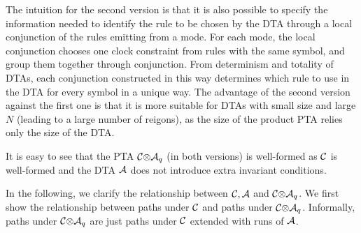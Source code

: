 The intuition for the second version is that it is also possible to specify the information needed to identify the rule to be chosen by the DTA through a local conjunction of the rules emitting from a mode.
For each mode, the local conjunction chooses one clock constraint from rules with the same symbol, and group them together through conjunction.
From determinism and totality of DTAs,
each conjunction constructed in this way determines which rule to use in the DTA for every symbol in a unique way.
The advantage of the second version against the first one is that it is more suitable for DTAs with small size and large $N$ (leading to a large number of reigons), as the size of the product PTA relies only the size of the DTA.
\vspace{-0.8em}
\begin{remark}
It is easy to see that the PTA ${\mathcal{C}}{\otimes}{\mathcal{A}_q}$ (in both versions) is well-formed as $\mathcal{C}$ is well-formed and the DTA $\mathcal{A}$ does not introduce extra invariant conditions.
\end{remark}
\vspace{-0.8em}




In the following, we clarify the relationship between $\mathcal{C},\mathcal{A}$ and ${\mathcal{C}}{\otimes}{\mathcal{A}_q}$.
We first show the relationship between paths under $\mathcal{C}$ and paths under ${\mathcal{C}}{\otimes}{\mathcal{A}_q}$.
Informally, paths under ${\mathcal{C}}{\otimes}{\mathcal{A}_q}$ are just paths under $\mathcal{C}$ extended with runs of $\mathcal{A}$.

